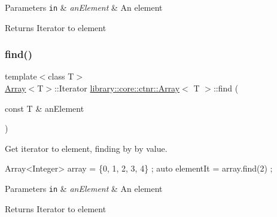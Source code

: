 \begin{DoxyParams}[1]{Parameters}
\mbox{\tt in}  & {\em an\+Element} & An element \\
\hline
\end{DoxyParams}
\begin{DoxyReturn}{Returns}
Iterator to element 
\end{DoxyReturn}
\mbox{\label{classlibrary_1_1core_1_1ctnr_1_1_array_afece85f642e3c623bac197e25ad2d4ec}} 
\subsubsection{\texorpdfstring{find()}{find()}\hspace{0.1cm}{\footnotesize\ttfamily [2/2]}}
{\footnotesize\ttfamily template$<$class T$>$ \\
\hyperlink{classlibrary_1_1core_1_1ctnr_1_1_array}{Array}$<$T$>$\+::Iterator \hyperlink{classlibrary_1_1core_1_1ctnr_1_1_array}{library\+::core\+::ctnr\+::\+Array}$<$ T $>$\+::find (\begin{DoxyParamCaption}\item[{const T \&}]{an\+Element }\end{DoxyParamCaption})}



Get iterator to element, finding by by value. 


\begin{DoxyCode}
Array<Integer> array = \{0, 1, 2, 3, 4\} ;
\textcolor{keyword}{auto} elementIt = array.find(2) ;
\end{DoxyCode}



\begin{DoxyParams}[1]{Parameters}
\mbox{\tt in}  & {\em an\+Element} & An element \\
\hline
\end{DoxyParams}
\begin{DoxyReturn}{Returns}
Iterator to element 
\end{DoxyReturn}
\mbox{\label{classlibrary_1_1core_1_1ctnr_1_1_array_aa8a3e2745d72db8181b42e3cfb55415c}} 
